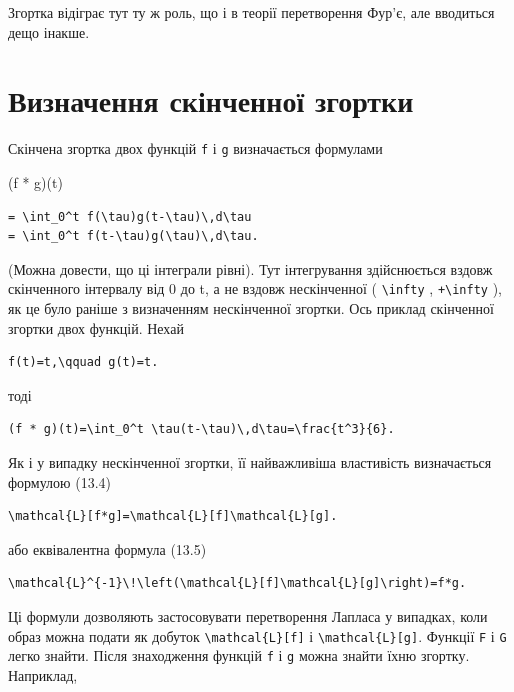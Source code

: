 \documentclass[
  ukrainian,
]{article}
\begin{document}
Згортка відіграє тут ту ж роль, що і в теорії перетворення Фур'є, але
вводиться дещо інакше.

\section{Визначення скінченної
згортки}\label{ux432ux438ux437ux43dux430ux447ux435ux43dux43dux44f-ux441ux43aux456ux43dux447ux435ux43dux43dux43eux457-ux437ux433ux43eux440ux442ux43aux438}

Скінчена згортка двох функцій \texttt{f} і \texttt{g} визначається
формулами

(f * g)(t)

\begin{verbatim}
= \int_0^t f(\tau)g(t-\tau)\,d\tau
= \int_0^t f(t-\tau)g(\tau)\,d\tau.
\end{verbatim}

(Можна довести, що ці інтеграли рівні). Тут інтегрування здійснюється
вздовж скінченного інтервалу від 0 до t, а не вздовж нескінченної (
\texttt{\textbackslash{}infty} , \texttt{+\textbackslash{}infty} ), як
це було раніше з визначенням нескінченної згортки. Ось приклад
скінченної згортки двох функцій. Нехай

\begin{verbatim}
f(t)=t,\qquad g(t)=t.
\end{verbatim}

тоді

\begin{verbatim}
(f * g)(t)=\int_0^t \tau(t-\tau)\,d\tau=\frac{t^3}{6}.
\end{verbatim}

Як і у випадку нескінченної згортки, її найважливіша властивість
визначається формулою (13.4)

\begin{verbatim}
\mathcal{L}[f*g]=\mathcal{L}[f]\mathcal{L}[g].
\end{verbatim}

або еквівалентна формула (13.5)

\begin{verbatim}
\mathcal{L}^{-1}\!\left(\mathcal{L}[f]\mathcal{L}[g]\right)=f*g.
\end{verbatim}

Ці формули дозволяють застосовувати перетворення Лапласа у випадках,
коли образ можна подати як добуток
\texttt{\textbackslash{}mathcal\{L\}{[}f{]}} і
\texttt{\textbackslash{}mathcal\{L\}{[}g{]}}. Функції \texttt{F} і
\texttt{G} легко знайти. Після знаходження функцій \texttt{f} і
\texttt{g} можна знайти їхню згортку. Наприклад,
\end{document}
